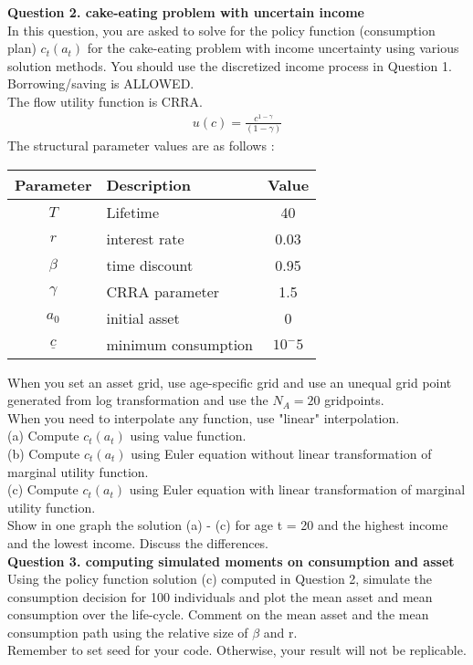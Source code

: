 \documentclass[paper=a4, fontsize=13pt]{extarticle} %
\numberwithin{equation}{section} %
\numberwithin{figure}{section} %
\numberwithin{table}{section} %
\begin{document}
\vspace{0.2in}
\textbf{Question 2. cake-eating problem with uncertain income} \\
In this question, you are asked to solve for the policy function (consumption plan) $c_t(a_t)$ for the cake-eating problem with income uncertainty using various solution methods. You should use the discretized income process in Question 1. Borrowing/saving is ALLOWED. \\
The flow utility function is CRRA.
\begin{gather}
u(c) = \frac{c^{1-\gamma}}{(1-\gamma)}
\end{gather}
The structural parameter values are as follows : \\
\begin{table}[H]
\centering
\begin{tabular}{c l c}
\hline
Parameter & Description & Value \\
\hline
$T$ & Lifetime & 40 \\
$r$ & interest rate & 0.03 \\
$\beta$ & time discount & 0.95 \\
$\gamma$ & CRRA parameter & 1.5 \\
$a_0$ & initial asset & 0 \\
$\underline{c}$ & minimum consumption & $10^-5$ \\
\hline
\end{tabular}
\end{table}
When you set an asset grid, use age-specific grid and use an unequal grid point generated from log transformation and use the $N_A=20$ gridpoints. \\
When you need to interpolate any function, use "linear" interpolation.\\
(a) Compute $c_t(a_t)$ using value function. \\
(b) Compute $c_t(a_t)$ using Euler equation without linear transformation of marginal utility function. \\
(c) Compute $c_t(a_t)$ using Euler equation with linear transformation of marginal utility function. \\

Show in one graph the solution (a) - (c) for age t = 20 and the highest income and the lowest income. Discuss the differences. \\



\vspace{0.2in}
\textbf{Question 3. computing simulated moments on consumption and asset} \\
Using the policy function solution (c) computed in Question 2, simulate the consumption decision for 100 individuals and plot the mean asset and mean consumption over the life-cycle. Comment on the mean asset and the mean consumption path using the relative size of $\beta$ and r. \\
\color{red} Remember to set seed for your code. Otherwise, your result will not be replicable.\\
\end{document}
